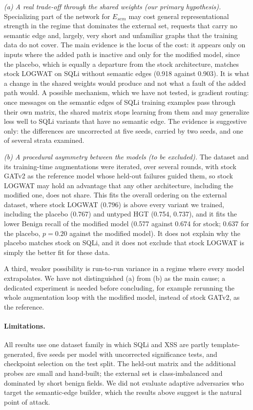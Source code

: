 \emph{(a) A real trade-off through the shared weights (our primary hypothesis).} Specializing part of the network for $E_{sem}$ may cost general representational strength in the regime that dominates the external set, requests that carry no semantic edge and, largely, very short and unfamiliar graphs that the training data do not cover. The main evidence is the locus of the cost: it appears only on inputs where the added path is inactive and only for the modified model, since the placebo, which is equally a departure from the stock architecture, matches stock LOGWAT on SQLi without semantic edges (0.918 against 0.903). It is what a change in the shared weights would produce and not what a fault of the added path would. A possible mechanism, which we have not tested, is gradient routing: once messages on the semantic edges of SQLi training examples pass through their own matrix, the shared matrix stops learning from them and may generalize less well to SQLi variants that have no semantic edge. The evidence is suggestive only: the differences are uncorrected at five seeds, carried by two seeds, and one of several strata examined.

\emph{(b) A procedural asymmetry between the models (to be excluded).} The dataset and its training-time augmentations were iterated, over several rounds, with stock GATv2 as the reference model whose held-out failures guided them, so stock LOGWAT may hold an advantage that any other architecture, including the modified one, does not share. This fits the overall ordering on the external dataset, where stock LOGWAT (0.796) is above every variant we trained, including the placebo (0.767) and untyped HGT (0.754, 0.737), and it fits the lower Benign recall of the modified model (0.577 against 0.674 for stock; 0.637 for the placebo, $p=0.20$ against the modified model). It does not explain why the placebo matches stock on SQLi, and it does not exclude that stock LOGWAT is simply the better fit for these data.

A third, weaker possibility is run-to-run variance in a regime where every model extrapolates. We have not distinguished (a) from (b) as the main cause; a dedicated experiment is needed before concluding, for example rerunning the whole augmentation loop with the modified model, instead of stock GATv2, as the reference.

\paragraph{Limitations.}
All results use one dataset family in which SQLi and XSS are partly template-generated, five seeds per model with uncorrected significance tests, and checkpoint selection on the test split. The held-out matrix and the additional probes are small and hand-built; the external set is class-imbalanced and dominated by short benign fields. We did not evaluate adaptive adversaries who target the semantic-edge builder, which the results above suggest is the natural point of attack.

